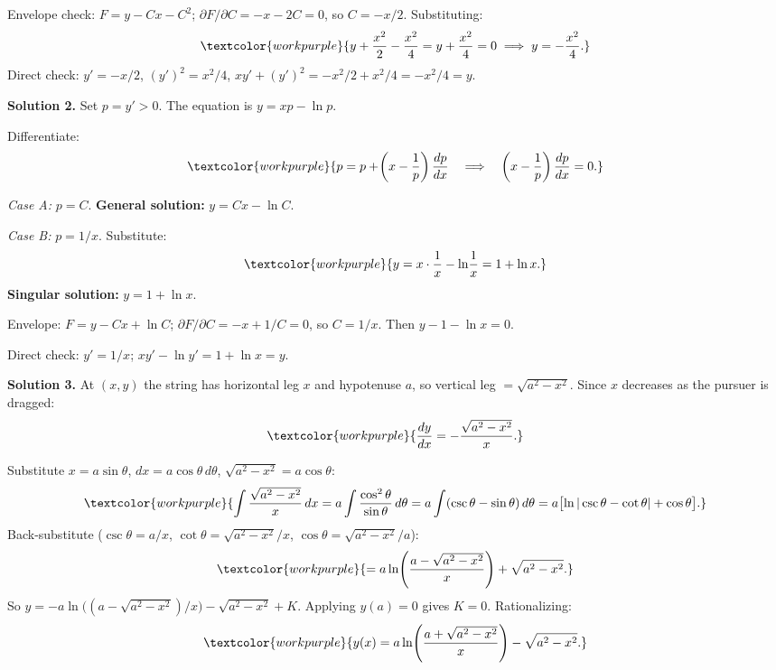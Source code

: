 Envelope check: $F = y - Cx - C^2$; $\partial F/\partial C = -x - 2C = 0$,
so $C = -x/2$. Substituting:
\[
  \textcolor{workpurple}{y + \frac{x^2}{2} - \frac{x^2}{4}
  = y + \frac{x^2}{4} = 0 \;\Longrightarrow\; y = -\frac{x^2}{4}.}
\]
Direct check: $y' = -x/2$, $(y')^2 = x^2/4$,
$xy' + (y')^2 = -x^2/2 + x^2/4 = -x^2/4 = y$. \checkmark

\medskip

\noindent\textbf{Solution 2.}\quad
Set $p = y' > 0$. The equation is $y = xp - \ln p$.

Differentiate:
\[
  \textcolor{workpurple}{p = p + \!\left(x - \frac{1}{p}\right)\frac{dp}{dx}
  \quad\Longrightarrow\quad
  \left(x - \frac{1}{p}\right)\frac{dp}{dx} = 0.}
\]

\textit{Case A:} $p = C$.
\textbf{General solution:} $y = Cx - \ln C$.

\textit{Case B:} $p = 1/x$. Substitute:
\[
  \textcolor{workpurple}{y = x\cdot\frac{1}{x} - \ln\!\frac{1}{x} = 1 + \ln x.}
\]
\textbf{Singular solution:} $y = 1 + \ln x$.

Envelope: $F = y - Cx + \ln C$; $\partial F/\partial C = -x + 1/C = 0$,
so $C = 1/x$. Then $y - 1 - \ln x = 0$. \checkmark

Direct check: $y' = 1/x$; $xy' - \ln y' = 1 + \ln x = y$. \checkmark

\medskip

\noindent\textbf{Solution 3.}\quad
At $(x,y)$ the string has horizontal leg $x$ and hypotenuse $a$, so vertical
leg $= \sqrt{a^2 - x^2}$. Since $x$ decreases as the pursuer is dragged:
\[
  \textcolor{workpurple}{\frac{dy}{dx} = -\frac{\sqrt{a^2 - x^2}}{x}.}
\]

Substitute $x = a\sin\theta$, $dx = a\cos\theta\,d\theta$,
$\sqrt{a^2 - x^2} = a\cos\theta$:
\[
  \textcolor{workpurple}{\int\frac{\sqrt{a^2-x^2}}{x}\,dx
  = a\int\frac{\cos^2\theta}{\sin\theta}\,d\theta
  = a\int(\csc\theta - \sin\theta)\,d\theta
  = a\bigl[\ln|\csc\theta - \cot\theta| + \cos\theta\bigr].}
\]
Back-substitute ($\csc\theta = a/x$, $\cot\theta = \sqrt{a^2-x^2}/x$,
$\cos\theta = \sqrt{a^2-x^2}/a$):
\[
  \textcolor{workpurple}{= a\ln\!\left(\frac{a - \sqrt{a^2-x^2}}{x}\right)
  + \sqrt{a^2-x^2}.}
\]
So $y = -a\ln\!\bigl((a-\sqrt{a^2-x^2})/x\bigr) - \sqrt{a^2-x^2} + K$.
Applying $y(a) = 0$ gives $K = 0$. Rationalizing:
\[
  \textcolor{workpurple}{y(x) = a\ln\!\left(\frac{a + \sqrt{a^2-x^2}}{x}\right)
  - \sqrt{a^2-x^2}.}
\]

